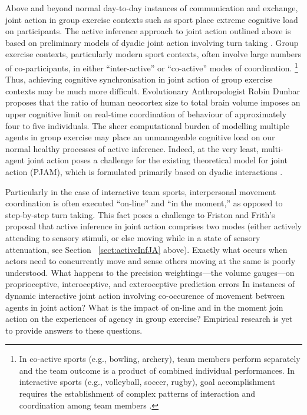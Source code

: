 \begin{CJK}{UTF8}{gbsn}
    Above and beyond normal day-to-day instances of communication and exchange, joint action in group exercise contexts such as sport place extreme cognitive load on participants. The active inference approach to joint action outlined above is based on preliminary models of dyadic joint action involving turn taking \citep[i.e., in bird song exchanges][]{Friston2015}.  Group exercise contexts, particularly modern sport contexts, often involve large numbers of co-participants, in either ``inter-active'' or ``co-active'' modes of coordination.
        \footnote{
        In co-active sports (e.g., bowling, archery), team members perform separately and the team outcome is a product of combined individual performances. In interactive sports (e.g., volleyball, soccer, rugby), goal accomplishment requires the establishment of complex patterns of interaction and coordination among team members \citep{Filho2014}.
        }
    Thus, achieving cognitive synchronisation in joint action of group exercise contexts may be much more difficult.  Evolutionary Anthropologist Robin Dunbar \textcite{Dunbar1992} proposes that the ratio of human neocortex size to total brain volume imposes an upper cognitive limit on real-time coordination of behaviour of approximately four to five individuals.  The sheer computational burden of modelling multiple agents in group exercise may place an unmanageable cognitive load on our normal healthy processes of active inference.  Indeed, at the very least, multi-agent joint action poses a challenge for the existing theoretical model for joint action (PJAM), which is formulated primarily based on dyadic interactions \citep{Pesquita2017}.

    Particularly in the case of interactive team sports, interpersonal movement coordination is often executed ``on-line'' and ``in the moment,'' as opposed to step-by-step turn taking.  This fact poses a challenge to Friston and Frith's proposal that active inference in joint action comprises two modes (either actively attending to sensory stimuli, or else moving while in a state of sensory attenuation, see Section ~\ref{sect:activeInfJA} above).  Exactly what occurs when actors need to concurrently move and sense others moving at the same is poorly understood.  What happens to the precision weightings---the volume gauges---on proprioceptive, interoceptive, and exteroceptive prediction errors In instances of dynamic interactive joint action involving co-occurence of movement between agents in joint action?   What is the impact of on-line and in the moment join action on the experiences of agency in group exercise?  Empirical research is yet to provide answers to these questions.


\end{CJK}
